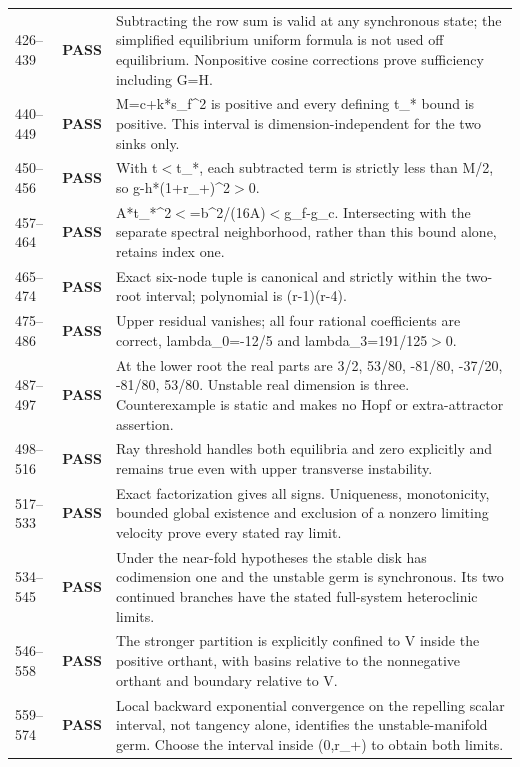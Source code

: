 \documentclass[11pt]{article}
\newcommand{\pass}{\textbf{PASS}}
\begin{document}
\begin{longtable}{@{}p{}p{}p{}@{}}
426--439 & \pass & Subtracting the row sum is valid at any synchronous state; the simplified equilibrium uniform formula is not used off equilibrium. Nonpositive cosine corrections prove sufficiency including G=H.\\
440--449 & \pass & M=c+k*s\_f\textasciicircum{}2 is positive and every defining t\_* bound is positive. This interval is dimension-independent for the two sinks only.\\
450--456 & \pass & With t\ensuremath{<}t\_*, each subtracted term is strictly less than M/2, so g-h*(1+r\_+)\textasciicircum{}2\ensuremath{>}0.\\
457--464 & \pass & A*t\_*\textasciicircum{}2\ensuremath{<}=b\textasciicircum{}2/(16A)\ensuremath{<}g\_f-g\_c. Intersecting with the separate spectral neighborhood, rather than this bound alone, retains index one.\\
465--474 & \pass & Exact six-node tuple is canonical and strictly within the two-root interval; polynomial is (r-1)(r-4).\\
475--486 & \pass & Upper residual vanishes; all four rational coefficients are correct, lambda\_0=-12/5 and lambda\_3=191/125\ensuremath{>}0.\\
487--497 & \pass & At the lower root the real parts are 3/2, 53/80, -81/80, -37/20, -81/80, 53/80. Unstable real dimension is three. Counterexample is static and makes no Hopf or extra-attractor assertion.\\
498--516 & \pass & Ray threshold handles both equilibria and zero explicitly and remains true even with upper transverse instability.\\
517--533 & \pass & Exact factorization gives all signs. Uniqueness, monotonicity, bounded global existence and exclusion of a nonzero limiting velocity prove every stated ray limit.\\
534--545 & \pass & Under the near-fold hypotheses the stable disk has codimension one and the unstable germ is synchronous. Its two continued branches have the stated full-system heteroclinic limits.\\
546--558 & \pass & The stronger partition is explicitly confined to V inside the positive orthant, with basins relative to the nonnegative orthant and boundary relative to V.\\
559--574 & \pass & Local backward exponential convergence on the repelling scalar interval, not tangency alone, identifies the unstable-manifold germ. Choose the interval inside (0,r\_+) to obtain both limits.\\

\end{longtable}
\end{document}

